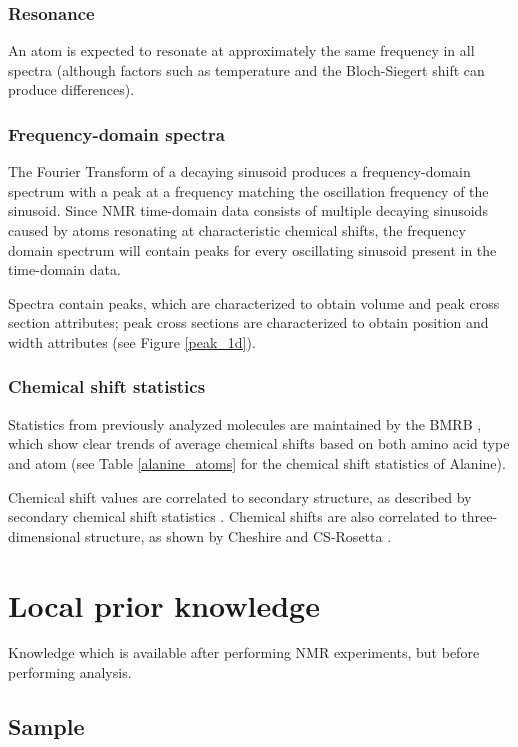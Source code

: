 \subsubsection{Resonance}
An atom is expected to resonate at approximately the same frequency in all
spectra (although factors such as temperature and the Bloch-Siegert shift 
can produce differences).

\subsubsection{Frequency-domain spectra}
The Fourier Transform of a decaying sinusoid produces a frequency-domain 
spectrum with a peak at a frequency matching the oscillation frequency of 
the sinusoid.  Since NMR time-domain data consists of multiple decaying 
sinusoids caused by atoms resonating at characteristic chemical shifts, 
the frequency domain spectrum will contain peaks for every oscillating 
sinusoid present in the time-domain data.  

Spectra contain peaks, which are characterized to obtain volume and peak
cross section attributes; peak cross sections are characterized to obtain 
position and width attributes (see Figure \ref{peak_1d}).

\subsubsection{Chemical shift statistics}
Statistics from previously analyzed molecules are maintained by the BMRB
\cite{bmrb}, which show clear trends of average chemical shifts based on
both amino acid type and atom (see Table \ref{alanine_atoms} for the 
chemical shift statistics of Alanine).

Chemical shift values are correlated to secondary structure, as described
by secondary chemical shift statistics \cite{spera1991empirical}.  Chemical 
shifts are also correlated to three-dimensional structure, as shown by 
Cheshire \cite{cheshire} and CS-Rosetta \cite{cs-rosetta}.  


\section{Local prior knowledge}
Knowledge which is available after performing NMR experiments, but before
performing analysis.

\subsection*{Sample}


